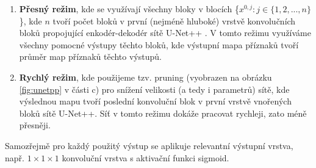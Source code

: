 \begin{enumerate}
    \item \textbf{Přesný režim}, kde se využívají všechny bloky v blocích \{\(x^{0, j} \colon j \in \{1,2,...,n\}\)\}, kde \(n\) tvoří počet bloků v první (nejméně hluboké) vrstvě konvolučních bloků propojující enkodér-dekodér sítě U-Net++ \cite{unetpp}. V tomto režimu využíváme všechny pomocné výstupy těchto bloků, kde výstupní mapa příznaků tvoří průměr map příznaků těchto výstupů.
    \item \textbf{Rychlý režim}, kde použijeme tzv. pruning (vyobrazen na obrázku \ref{fig:unetpp} v části c) pro snížení velikosti (a tedy i parametrů) sítě, kde výslednou mapu tvoří poslední konvoluční blok v první vrstvě vnořených bloků sítě U-Net++. Síť v tomto režimu dokáže pracovat rychleji, zato méně přesněji.
\end{enumerate}

Samozřejmě pro každý použitý výstup se aplikuje relevantní výstupní vrstva, např. $1\times1\times1$ konvoluční vrstva s aktivační funkci sigmoid.

\endinput